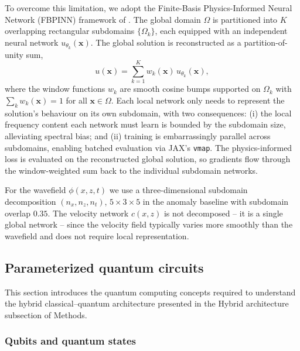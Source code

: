 \documentclass[11pt,a4paper]{article}
\begin{document}
To overcome this limitation, we adopt the Finite-Basis Physics-Informed Neural Network (FBPINN) framework of \citet{Moseley2023}. The global domain $\Omega$ is partitioned into $K$ overlapping rectangular subdomains $\{\Omega_k\}$, each equipped with an independent neural network $u_{\theta_k}(\mathbf{x})$. The global solution is reconstructed as a partition-of-unity sum,
\begin{equation}
    u(\mathbf{x}) = \sum_{k=1}^{K} w_k(\mathbf{x})\, u_{\theta_k}(\mathbf{x}),
\end{equation}
where the window functions $w_k$ are smooth cosine bumps supported on $\Omega_k$ with $\sum_k w_k(\mathbf{x}) = 1$ for all $\mathbf{x} \in \Omega$. Each local network only needs to represent the solution's behaviour on its own subdomain, with two consequences: (i) the local frequency content each network must learn is bounded by the subdomain size, alleviating spectral bias; and (ii) training is embarrassingly parallel across subdomains, enabling batched evaluation via JAX's \texttt{vmap}. The physics-informed loss is evaluated on the reconstructed global solution, so gradients flow through the window-weighted sum back to the individual subdomain networks.

For the wavefield $\phi(x,z,t)$ we use a three-dimensional subdomain decomposition $(n_x, n_z, n_t)$, $5\!\times\!3\!\times\!5$ in the anomaly baseline with subdomain overlap $0.35$. The velocity network $c(x,z)$ is not decomposed -- it is a single global network -- since the velocity field typically varies more smoothly than the wavefield and does not require local representation.

\subsection{Parameterized quantum circuits}
\label{sec:methods_pqc}

This section introduces the quantum computing concepts required to
understand the hybrid classical--quantum architecture presented in
the Hybrid architecture subsection of Methods.

\subsubsection{Qubits and quantum states}
\end{document}
